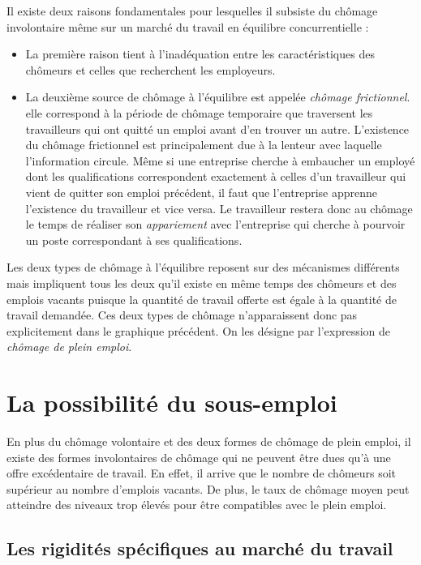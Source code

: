 \documentclass[10pt]{book}
\begin{document}
Il existe deux raisons fondamentales pour lesquelles il subsiste du chômage involontaire même sur un marché du travail en équilibre concurrentielle : 
\begin{itemize}
  \item La première raison tient à l'inadéquation entre les caractéristiques des chômeurs et celles que recherchent les employeurs.
  \item La deuxième source de chômage à l'équilibre est appelée \textit{chômage frictionnel}. elle correspond à la période de chômage temporaire que traversent les travailleurs qui ont quitté un emploi avant d'en trouver un autre. L'existence du chômage frictionnel est principalement due à la lenteur avec laquelle l'information circule. Même si une entreprise cherche à embaucher un employé dont les qualifications correspondent exactement à celles d'un travailleur qui vient de quitter son emploi précédent, il faut que l'entreprise apprenne l'existence du travailleur et vice versa. Le travailleur restera donc au chômage le temps de réaliser son \textit{appariement} avec l'entreprise qui cherche à pourvoir un poste correspondant à ses qualifications.
\end{itemize}
Les deux types de chômage à l'équilibre reposent sur des mécanismes différents mais impliquent tous les deux qu'il existe en même temps des chômeurs et des emplois vacants puisque la quantité de travail offerte est égale à la quantité de travail demandée. Ces deux types de chômage n'apparaissent donc pas explicitement dans le graphique précédent. On les désigne par l'expression de \textit{chômage de plein emploi}.

\section{La possibilité du sous-emploi}
En plus du chômage volontaire et des deux formes de chômage de plein emploi, il existe des formes involontaires de chômage qui ne peuvent être dues qu'à une offre excédentaire de travail. En effet, il arrive que le nombre de chômeurs soit supérieur au nombre d'emplois vacants. De plus, le taux de chômage moyen peut atteindre des niveaux trop élevés pour être compatibles avec le plein emploi.
\subsection{Les rigidités spécifiques au marché du travail}
\end{document}
